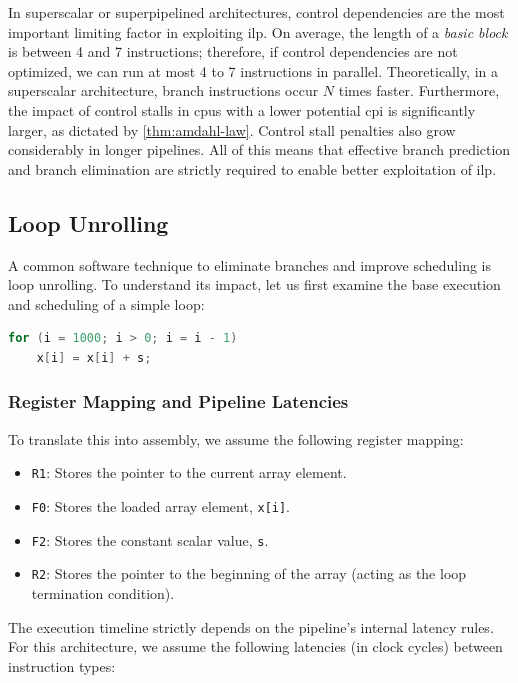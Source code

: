 In superscalar or superpipelined architectures, control dependencies are the most important limiting factor in exploiting \gls{ilp}. On average, the length of a \textit{basic block} is between 4 and 7 instructions; therefore, if control dependencies are not optimized, we can run at most 4 to 7 instructions in parallel. Theoretically, in a superscalar architecture, branch instructions occur \(N\) times faster. Furthermore, the impact of control stalls in \glspl{cpu} with a lower potential \gls{cpi} is significantly larger, as dictated by \cref{thm:amdahl-law}. Control stall penalties also grow considerably in longer pipelines. All of this means that effective branch prediction and branch elimination are strictly required to enable better exploitation of \gls{ilp}.

\subsection{Loop Unrolling}

A common software technique to eliminate branches and improve scheduling is loop unrolling. To understand its impact, let us first examine the base execution and scheduling of a simple loop:

\begin{lstlisting}[language=C]
for (i = 1000; i > 0; i = i - 1)
    x[i] = x[i] + s;
\end{lstlisting}

\subsubsection*{Register Mapping and Pipeline Latencies}
To translate this into assembly, we assume the following register mapping:
\begin{itemize}
    \item \texttt{R1}: Stores the pointer to the current array element.
    \item \texttt{F0}: Stores the loaded array element, \texttt{x[i]}.
    \item \texttt{F2}: Stores the constant scalar value, \texttt{s}.
    \item \texttt{R2}: Stores the pointer to the beginning of the array (acting as the loop termination condition).
\end{itemize}

The execution timeline strictly depends on the pipeline's internal latency rules. For this architecture, we assume the following latencies (in clock cycles) between instruction types:


